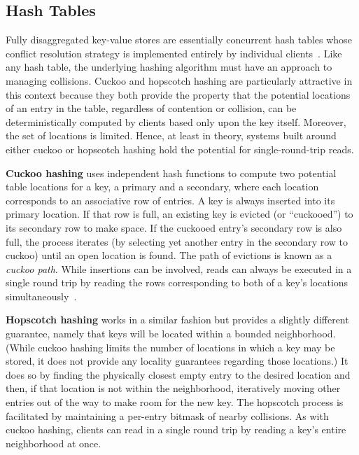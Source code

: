 \documentclass[12pt]{ucsddissertation}
\begin{document}
\subsection{Hash Tables}
\label{sec:hashtables}

Fully disaggregated key-value stores are essentially concurrent hash tables whose conflict
resolution strategy is implemented entirely by individual clients~\cite{rolex,fusee,race}. Like any
hash table, the underlying hashing algorithm must have an approach to managing collisions. Cuckoo
and hopscotch hashing are particularly attractive in this context because they both provide the
property that the potential locations of an entry in the table, regardless of contention or
collision, can be deterministically computed by clients based only upon the key itself. Moreover,
the set of locations is limited. Hence, at least in theory, systems built around either cuckoo or
hopscotch hashing hold the potential for single-round-trip reads.

\textbf{Cuckoo hashing} uses independent hash functions to compute two potential table locations for
a key, a primary and a secondary, where each location corresponds to an associative row of entries.
A key is always inserted into its primary location. If that row is full, an existing key is evicted
(or “cuckooed”) to its secondary row to make space. If the cuckooed entry’s secondary row is also
full, the process iterates (by selecting yet another entry in the secondary row to cuckoo) until an
open location is found. The path of evictions is known as a \textit{cuckoo path}. While insertions
can be involved, reads can always be executed in a single round trip by reading the rows
corresponding to both of a key’s locations simultaneously~\cite{pilaf}.

\textbf{Hopscotch hashing} works in a similar fashion but provides a slightly different guarantee,
namely that keys will be located within a bounded neighborhood. (While cuckoo hashing limits the
number of locations in which a key may be stored, it does not provide any locality guarantees
regarding those locations.) It does so by finding the physically closest empty entry to the desired
location and then, if that location is not within the neighborhood, iteratively moving other entries
out of the way to make room for the new key. The hopscotch process is facilitated by maintaining a
per-entry bitmask of nearby collisions. As with cuckoo hashing, clients can read in a single round
trip by reading a key’s entire neighborhood at once.
\end{document}
